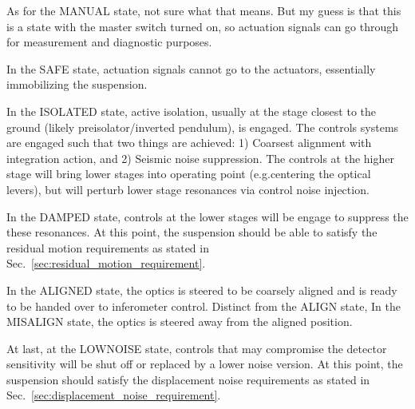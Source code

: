 As for the MANUAL state, not sure what that means.
But my guess is that this is a state with the master switch turned on, so actuation signals can go through for measurement and diagnostic purposes.

In the SAFE state, actuation signals cannot go to the actuators, essentially immobilizing the suspension.

In the ISOLATED state, active isolation, usually at the stage closest to the ground (likely preisolator/inverted pendulum), is engaged.
The controls systems are engaged such that two things are achieved: 1) Coarsest alignment with integration action, and 2) Seismic noise suppression.
The controls at the higher stage will bring lower stages into operating point (e.g.centering the optical levers), but will perturb lower stage resonances via control noise injection.

In the DAMPED state, controls at the lower stages will be engage to suppress the these resonances.
At this point, the suspension should be able to satisfy the residual motion requirements as stated in Sec.~\ref{sec:residual_motion_requirement}.

In the ALIGNED state, the optics is steered to be coarsely aligned and is ready to be handed over to inferometer control.
Distinct from the ALIGN state, In the MISALIGN state, the optics is steered away from the aligned position.

At last, at the LOWNOISE state, controls that may compromise the detector sensitivity will be shut off or replaced by a lower noise version.
At this point, the suspension should satisfy the displacement noise requirements as stated in Sec.~\ref{sec:displacement_noise_requirement}.


